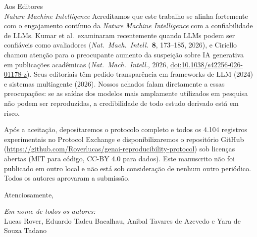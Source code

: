 \documentclass[11pt]{letter}
\begin{document}
\begin{letter}{Aos Editores\\
\textit{Nature Machine Intelligence}}
Acreditamos que este trabalho se alinha fortemente com o engajamento cont\'inuo da \textit{Nature Machine Intelligence} com a confiabilidade de LLMs. Kumar et al.\ examinaram recentemente quando LLMs podem ser confi\'aveis como avaliadores (\textit{Nat.\ Mach.\ Intell.}\ \textbf{8}, 173--185, 2026), e Ciriello chamou aten\c{c}\~ao para o preocupante aumento da suspei\c{c}\~ao sobre IA generativa em publica\c{c}\~oes acad\^emicas (\textit{Nat.\ Mach.\ Intell.}, 2026, \href{https://doi.org/10.1038/s42256-026-01178-z}{doi:10.1038/s42256-026-01178-z}). Seus editoriais t\^em pedido transpar\^encia em frameworks de LLM (2024) e sistemas multiagente (2026). Nossos achados falam diretamente a essas preocupa\c{c}\~oes: se as sa\'idas dos modelos mais amplamente utilizados em pesquisa n\~ao podem ser reproduzidas, a credibilidade de todo estudo derivado est\'a em risco.

Ap\'os a aceita\c{c}\~ao, depositaremos o protocolo completo e todos os 4.104 registros experimentais no Protocol Exchange e disponibilizaremos o reposit\'orio GitHub (\url{https://github.com/Roverlucas/genai-reproducibility-protocol}) sob licen\c{c}as abertas (MIT para c\'odigo, CC-BY 4.0 para dados). Este manuscrito n\~ao foi publicado em outro local e n\~ao est\'a sob considera\c{c}\~ao de nenhum outro peri\'odico. Todos os autores aprovaram a submiss\~ao.

\closing{Atenciosamente,}

\vspace{-1cm}
\noindent\textit{Em nome de todos os autores:}\\
Lucas Rover, Eduardo Tadeu Bacalhau, Anibal Tavares de Azevedo e Yara de Souza Tadano

\end{letter}
\end{document}
